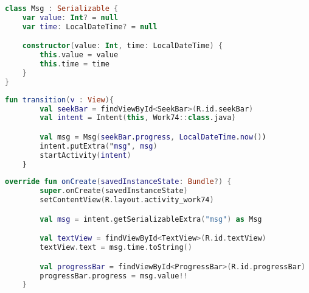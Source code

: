 \begin{lstlisting}[language=Kotlin, caption=\leftline{}, label=lst:serializable1]
class Msg : Serializable {
    var value: Int? = null
    var time: LocalDateTime? = null

    constructor(value: Int, time: LocalDateTime) {
        this.value = value
        this.time = time
    }
}
\end{lstlisting}

\begin{lstlisting}[language=Kotlin, caption=\leftline{}, label=lst:serializable2]
fun transition(v : View){
        val seekBar = findViewById<SeekBar>(R.id.seekBar)
        val intent = Intent(this, Work74::class.java)

        val msg = Msg(seekBar.progress, LocalDateTime.now())
        intent.putExtra("msg", msg)
        startActivity(intent)
    }
\end{lstlisting}

\begin{lstlisting}[language=Kotlin, caption=\leftline{}, label=lst:serializable3]
override fun onCreate(savedInstanceState: Bundle?) {
        super.onCreate(savedInstanceState)
        setContentView(R.layout.activity_work74)

        val msg = intent.getSerializableExtra("msg") as Msg

        val textView = findViewById<TextView>(R.id.textView)
        textView.text = msg.time.toString()

        val progressBar = findViewById<ProgressBar>(R.id.progressBar)
        progressBar.progress = msg.value!!
    }
\end{lstlisting}


